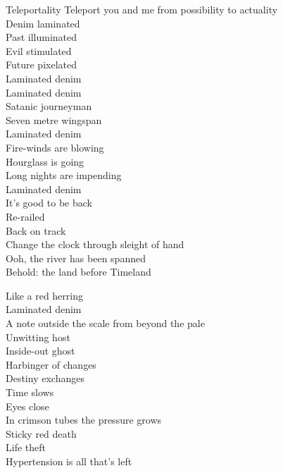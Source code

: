 Teleportality
Teleport you and me from possibility to actuality \\
Denim laminated \\
Past illuminated \\
Evil stimulated \\
Future pixelated \\

Laminated denim \\

Laminated denim \\
Satanic journeyman \\
Seven metre wingspan \\
Laminated denim \\
Fire-winds are blowing \\
Hourglass is going \\
Long nights are impending \\
Laminated denim \\

It's good to be back \\
Re-railed \\
Back on track \\
Change the clock through sleight of hand \\
Ooh, the river has been spanned \\
Behold: the land before Timeland \\




Like a red herring \\
Laminated denim \\
A note outside the scale from beyond the pale \\
Unwitting host \\
Inside-out ghost \\
Harbinger of changes \\
Destiny exchanges \\
Time slows \\
Eyes close \\
In crimson tubes the pressure grows \\
Sticky red death \\
Life theft \\
Hypertension is all that's left \\

